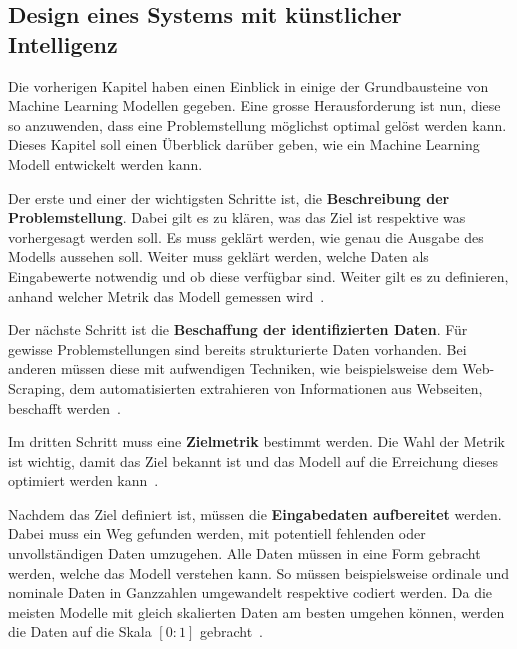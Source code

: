 
\subsection{Design eines Systems mit künstlicher Intelligenz}

Die vorherigen Kapitel haben einen Einblick in einige der Grundbausteine von Machine Learning Modellen gegeben. Eine grosse Herausforderung ist nun, diese so anzuwenden, dass eine Problemstellung möglichst optimal gelöst werden kann. Dieses Kapitel soll einen Überblick darüber geben, wie ein Machine Learning Modell entwickelt werden kann.

Der erste und einer der wichtigsten Schritte ist, die \textbf{Beschreibung der Problemstellung}. Dabei gilt es zu klären, was das Ziel ist respektive was vorhergesagt werden soll. Es muss geklärt werden, wie genau die Ausgabe des Modells aussehen soll. Weiter muss geklärt werden, welche Daten als Eingabewerte notwendig und ob diese verfügbar sind. Weiter gilt es zu definieren, anhand welcher Metrik das Modell gemessen wird~\autocite{DesignML}.

Der nächste Schritt ist die \textbf{Beschaffung der identifizierten Daten}. Für gewisse Problemstellungen sind bereits strukturierte Daten vorhanden. Bei anderen müssen diese mit aufwendigen Techniken, wie beispielsweise dem Web-Scraping, dem automatisierten extrahieren von Informationen aus Webseiten, beschafft werden~\autocite{DesignML}.

Im dritten Schritt muss eine \textbf{Zielmetrik} bestimmt werden. Die Wahl der Metrik ist wichtig, damit das Ziel bekannt ist und das Modell auf die Erreichung dieses optimiert werden kann~\autocite{DesignML}.

Nachdem das Ziel definiert ist, müssen die \textbf{Eingabedaten aufbereitet} werden. Dabei muss ein Weg gefunden werden, mit potentiell fehlenden oder unvollständigen Daten umzugehen. Alle Daten müssen in eine Form gebracht werden, welche das Modell verstehen kann. So müssen beispielsweise ordinale und nominale Daten in Ganzzahlen umgewandelt respektive codiert werden. Da die meisten Modelle mit gleich skalierten Daten am besten umgehen können, werden die Daten auf die Skala $[0:1]$ gebracht~\autocite{DesignML}.

